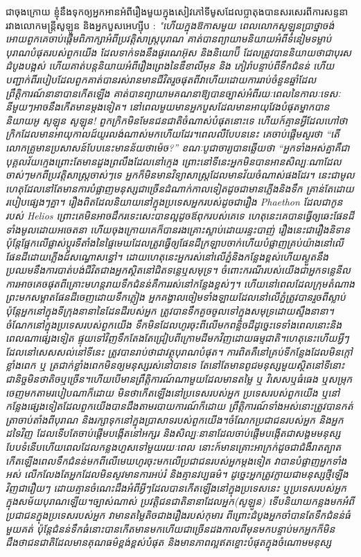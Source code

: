 \documentclass[10pt,twocolumn,letterpaper]{article}
\begin{document}
ជាចុងក្រោយ ខ្ញុំនឹងទុកឲ្យអ្នកអានអំពីរឿងមួយក្នុងសៀវភៅទីមូសដែលប្លាតុងបានសរសេរពីការសន្ទនារវាងលោកមន្រ្តីសូឡូន  និងអ្នកបួសអេហ្ស៊ីប \cite{140}: \textit{"ហើយក្នុងឱកាសមួយ ពេលលោកសូឡុនប្រាថ្នាចង់អោយពួកគេចាប់ផ្តើមពិភាក្សាអំពីប្រវត្តិសាស្រ្តបុរាណ គាត់បានព្យាយាមនិយាយអំពីទំនៀមទម្លាប់បុរាណបំផុតរបស់ពួកយើង ដែលទាក់ទងនឹងផូរណេអ៊ុស និងនិយោប៊ី ដែលត្រូវបាននិយាយថាជាបុរសដំបូងបង្អស់ ​ហើយគាត់បន្តនិយាយអំពីរឿងព្រេងនៃឌឺខាលីអុន និង ភៀរ៉ាបន្ទាប់ពីទឹកជំនន់ ហើយបញ្ជាក់ពីរបៀបដែលពួកគាត់បានរស់រានមានជីវិតរួចផុតពីវាហើយ​ដោយការរាប់ចំនួនឆ្នាំដែលព្រឹត្តិការណ៍នានាបានកើតឡើង គាត់បានព្យាយាមគណនាឱ្យបានច្បាស់អំពីរយៈពេលនៃកាលៈទេសៈនីមួយៗអាចនឹងកើតមានម្តងទៀត។
នៅពេលមួយមានអ្នកបួសដែលមានអាយុវែងបំផុតម្នាកបាននិយាយ​អូ សូឡុន សូឡុន! ពួកក្រិកមិនមែនជនជាតិចំណាស់បំផុតនោះទេ  ហើយក៍គ្មានអ្វីដែលហៅថាក្រិកដែលមានអាយុកាលដ៍យូរលង់ណាស់មកហើយដែរ។​ពេលលឺបែបននេះ គេចាប់ផ្តើមសួរថា “តើលោកគ្រូមានប្រសាសន៍បែបនេះមានន័យថាម៉េច?” ខណៈបូជាចារ្យបានឆ្លើយថា “អ្នកទាំងអស់គ្នាគឺជាបុគ្គលវ័យក្មេងព្រោះតែមានដួងព្រលឹងដែលនៅក្មេង ព្រោះនៅទីនេះអ្នកមិនបានអានសិល្បៈណាដែលចាស់ៗមកពីប្រវត្តិសាស្ត្រចាស់ៗទេ អ្នកក៏មិនមានវិទ្យាសាស្ត្រដែលមានវ័យចំណាស់ផងដែរ។ នេះជាមូលហេតុដែលនៅតែមានការបំផ្លាញមនុស្សជាច្រើនដំណាក់កាលទៀតដូចជាមានភ្លើងនិងទឹក គ្រាន់តែដោយរបៀបផ្សេងៗគ្នា។ រឿងពិតដែលនិយាយនៅក្នុងប្រទេសអ្នករបស់ដូចជារឿង Phaethon ដែលជាកូនរបស់ Helios ព្រោះគេមិនអាចដឹករទេះសេះបានល្អដូចឪពុករបស់គេទេ ហេតុនេះគេបានធ្វើឲ្យឆេះផែនដីទាំងមូលដោយអចេតនា ហើយចុងក្រោយគេក៏បានរងគ្រោះស្លាប់ដោយរន្ទះបាញ់ រឿងនេះជារឿងនិទាន ប៉ុន្តែផ្អែកលើផ្លាស់ប្តូរទីតាំងនៃផ្ទៃមេឃដែលត្រូវធ្វើឲ្យផែនដីក្រឡាបចាក់​ហើយបំផ្លាញគ្រប់យ៉ាងនៅលើផែនដីដោយភ្លើងដ៍សណ្ធោសន្ធៅ។ ដោយហេតុនេះអ្នករស់នៅលើភ្នំនិងកន្លែងខ្ពស់ហើយស្ងួតនឹងប្រឈមនឹងការបាត់បង់ជីវិតជាងអ្នកស្ថិតនៅជិតទន្លេឬសមុទ្រ។ ចំពោះករណីរបស់យើងជាអ្នកទន្លេនីល​ការអាចគេចផុតពីគ្រោះមហន្តរាយទឹកជំនន់គឺការរស់នៅកន្លែងខ្ពស់ៗ។ ហើយនៅពេលដែលក្រុមតំណាងព្រះមកសម្អាតផែនដីចេញដោយទឹកភ្លៀង អ្នកគង្វាលចៀមទាំងឡាយដែលនៅលើភ្នំត្រូវបានរួចពីស្លាប់​ប៉ុន្តែអ្នកនៅក្នុងទីក្រុងនានានៃដែនដីរបស់អ្នក ត្រូវបានទឹកគួចចូលទៅក្នុងសមុទ្រដោយស្ទឹងនានា។ ចំណែកនៅក្នុងប្រទេសរបស់ពួកយើង ទឹកមិនដែលហូរចុះពីលើមកពន្លិចដីដូច្នេះទេទាំងពេលនោះនិងពេលណាផ្សេងទៀត ផ្ទុយទៅវិញទឹកតែងតែជ្រៀបពីក្រោមដីមកវិញដោយធម្មជាតិ។​ហេតុនេះហើយអ្វីៗដែលនៅសេសសល់នៅទីនេះ ត្រូវបានរាប់ថាជាវត្ថុបុរាណបំផុត។ ការពិតគឺនៅគ្រប់ទីកន្លែងដែលមិនក្តៅខ្លាំងពេក ឬ ត្រជាក់ខ្លាំងពេកមិនឲ្យមនុស្សរស់នៅបានទេ តែនៅតែមានពូជមនុស្សមួយស្ថិតនៅទីនោះជានិច្ចមិនថាតិចឬច្រើន។ហើយបើមានព្រឹត្តិការណ៍ណាមួយដែលមានតម្លៃ ឬ វិសេសឬធំធេង ឬសម្រុកចេញមកតាមរបៀបណាក៏ដោយ មិនថាកើតឡើងនៅប្រទេសរបស់អ្នក ប្រទេសរបស់ពួកយើង ឬនៅកន្លែងផ្សេងទៀតដែលពួកយើងបានដឹងតាមរបាយការណ៍ក៏ដោយ ព្រឹត្តិការណ៍ទាំងអស់នោះត្រូវបានកត់ត្រាចាប់តាំងពីបុរាណ និងរក្សាទុកនៅក្នុងប្រាសាទរបស់ពួកយើង។ចំណែកប្រជាជនរបស់អ្នក និងអ្នកដទៃវិញ ដែលទើបតែចាប់ផ្តើមបង្កើតនៅអក្សរ និងសិល្បៈនានាដែលចាប់ផ្តើមបង្កើតជាសង្គមមនុស្សបែបទំនើប​ហើយពេលដែលកន្លងហួសទៅមួយរយៈពេល នោះក៍មានគ្រោះអាក្រក់ដូចជាជំងឺរាតត្បាតកើតឡើង​ពេលទឹកជំនន់មកពីលើមេឃហូរចុះមកលើប្រជាជនរបស់អ្នកម្តងទៀត វាបានបំផ្លាញអ្នកទាំងអស់ លើកលែងតែអ្នកដែលមិនសូវមានការអប់រំ និងគ្មានវប្បធម៌។ ដូច្នេះអ្នកត្រូវក្លាយជាមនុស្សថ្មីឡើងវិញជារឿយៗ ដោយគ្មានចំណេះដឹងអំពីអ្វីៗដែលបានកើតឡើងនៅក្នុងប្រទេសនេះ ឬប្រទេសរបស់អ្នកក្នុងសម័យបុរាណឡើយ។ច្បាស់ណាស់ ប្រវត្តិជនជាតិនានាដែលអ្នក​(សូឡូន) ទើបនិយាយកន្លងមកអំពីប្រជាជនក្នុងប្រទេសរបស់អ្នក វាមានតម្លៃតិចជាងរឿងរបស់កុមារ ពីព្រោះដំបូងអ្នកចាំបានតែទឹកជំនន់ធំមួយគត់ ប៉ុន្តែជំនន់ទឹកធំនោះបានកើតមានមកហើយជាច្រើនដងកាលពីមុនមក​បន្ទាប់មកអ្នកក៏មិនដឹងថាជនជាតិដែលមានគុណធម៌ខ្ពង់ខ្ពស់បំផុត និងមានភាពល្អឥតខ្ចោះបំផុតក្នុងចំណោមមនុស្ស }
\end{document}
